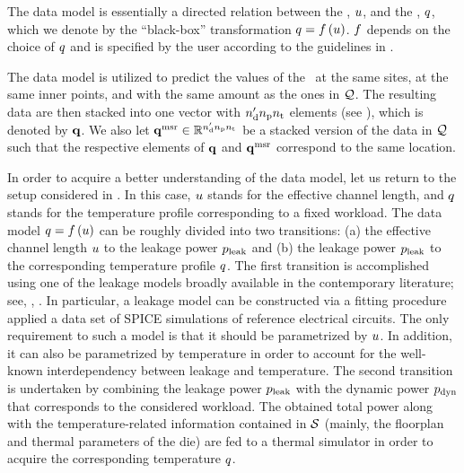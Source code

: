 The data model is essentially a directed relation between the \qoi, $u$, and the \qom, $q$, which we denote by the ``black-box'' transformation $\q = \oBB{\u}$.
$\oBB$ depends on the choice of $q$ and is specified by the user according to the guidelines in .

The data model is utilized to predict the values of the \qom\ at the same sites, at the same inner points, and with the same amount as the ones in $\mathcal{Q}$.
The resulting data are then stacked into one vector with ${n_\text{d}'} {n_\text{p}} {n_\text{t}}$ elements (see ), which is denoted by $\mathbf{q}$.
We also let $\mathbf{q}^{\text{msr}} \in \mathbb{R}^{{n_\text{d}'} {n_\text{p}} {n_\text{t}}}$ be a stacked version of the data in $\mathcal{Q}$ such that the respective elements of $\mathbf{q}$ and $\mathbf{q}^{\text{msr}}$ correspond to the same location.

In order to acquire a better understanding of the data model, let us return to the setup considered in .
In this case, $u$ stands for the effective channel length, and $q$ stands for the temperature profile corresponding to a fixed workload.
The data model $\q = \oBB{\u}$ can be roughly divided into two transitions: (a) the effective channel length $u$ to the leakage power $p_{\text{leak}}$ and (b) the leakage power $p_{\text{leak}}$ to the corresponding temperature profile $q$.
The first transition is accomplished using one of the leakage models broadly available in the contemporary literature; see, \eg, \cite{chandrakasan2001, srivastava2010, juan2012}.
In particular, a leakage model can be constructed via a fitting procedure applied a data set of SPICE simulations of reference electrical circuits.
The only requirement to such a model is that it should be parametrized by $u$.
In addition, it can also be parametrized by temperature in order to account for the well-known interdependency between leakage and temperature.
The second transition is undertaken by combining the leakage power $p_{\text{leak}}$ with the dynamic power $p_{\text{dyn}}$ that corresponds to the considered workload.
The obtained total power along with the temperature-related information contained in $\mathcal{S}$ (mainly, the floorplan and thermal parameters of the die) are fed to a thermal simulator in order to acquire the corresponding temperature $q$.
